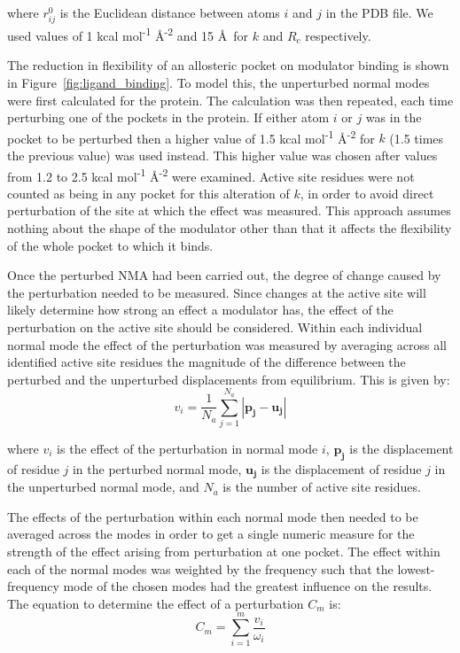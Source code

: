 where $r_{ij}^{0}$ is the Euclidean distance between atoms $i$ and $j$ in the PDB file.
We used values of 1 kcal mol\textsuperscript{-1} \AA\textsuperscript{-2} and 15 \AA\ for $k$ and $R_{c}$ respectively.

The reduction in flexibility of an allosteric pocket on modulator binding is shown in Figure~\ref{fig:ligand_binding}.
To model this, the unperturbed normal modes were first calculated for the protein.
The calculation was then repeated, each time perturbing one of the pockets in the protein.
If either atom $i$ or $j$ was in the pocket to be perturbed then a higher value of 1.5 kcal mol\textsuperscript{-1} \AA\textsuperscript{-2} for $k$ (1.5 times the previous value) was used instead.
This higher value was chosen after values from 1.2 to 2.5 kcal mol\textsuperscript{-1} \AA\textsuperscript{-2} were examined.
Active site residues were not counted as being in any pocket for this alteration of $k$, in order to avoid direct perturbation of the site at which the effect was measured.
This approach assumes nothing about the shape of the modulator other than that it affects the flexibility of the whole pocket to which it binds.

Once the perturbed NMA had been carried out, the degree of change caused by the perturbation needed to be measured.
Since changes at the active site will likely determine how strong an effect a modulator has, the effect of the perturbation on the active site should be considered.
Within each individual normal mode the effect of the perturbation was measured by averaging across all identified active site residues the magnitude of the difference between the perturbed and the unperturbed displacements from equilibrium.
This is given by:
$$
v_{i} = \frac{1}{N_{a}} \sum_{j=1}^{N_{a}} \left | \mathbf{p_{j}} - \mathbf{u_{j}} \right |
$$

where $v_{i}$ is the effect of the perturbation in normal mode $i$, $\mathbf{p_{j}}$ is the displacement of residue $j$ in the perturbed normal mode, $\mathbf{u_{j}}$ is the displacement of residue $j$ in the unperturbed normal mode, and $N_{a}$ is the number of active site residues.

The effects of the perturbation within each normal mode then needed to be averaged across the modes in order to get a single numeric measure for the strength of the effect arising from perturbation at one pocket.
The effect within each of the normal modes was weighted by the frequency such that the lowest-frequency mode of the chosen modes had the greatest influence on the results.
The equation to determine the effect of a perturbation $C_{m}$ is:
$$
C_{m} = \sum_{i=1}^{m} \frac{v_{i}}{\omega_{i}}
$$

